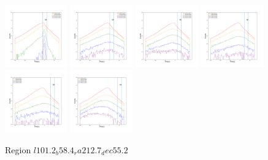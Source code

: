 \documentclass[12pt,prd]{article}
\begin{document}
\begin{figure}[h!]
\includegraphics[width=0.24\textwidth]{../figures/scanning_plotsgaiascan_l101_2_b58_4_ra212_7_dec55_2_npy_12.pdf}
\includegraphics[width=0.24\textwidth]{../figures/scanning_plotsgaiascan_l101_2_b58_4_ra212_7_dec55_2_npy_13.pdf}
\includegraphics[width=0.24\textwidth]{../figures/scanning_plotsgaiascan_l101_2_b58_4_ra212_7_dec55_2_npy_14.pdf}
\includegraphics[width=0.24\textwidth]{../figures/scanning_plotsgaiascan_l101_2_b58_4_ra212_7_dec55_2_npy_15.pdf}
\includegraphics[width=0.24\textwidth]{../figures/scanning_plotsgaiascan_l101_2_b58_4_ra212_7_dec55_2_npy_16.pdf}
\includegraphics[width=0.24\textwidth]{../figures/scanning_plotsgaiascan_l101_2_b58_4_ra212_7_dec55_2_npy_17.pdf}
\caption{Region $l101.2_b58.4_ra212.7_dec55.2$}
\end{figure}
\end{document}
